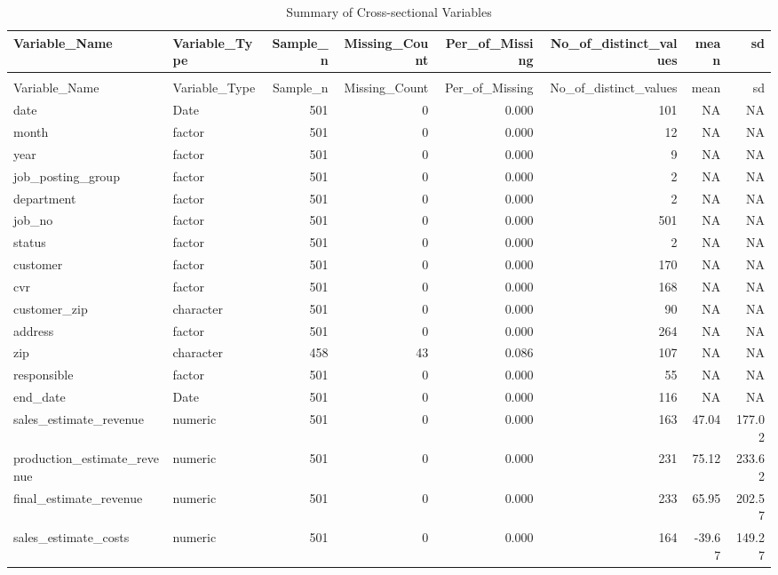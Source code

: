 \begingroup\fontsize{9}{11}\selectfont

\begin{landscape}
\begin{longtable}[t]{llrrrrrr}
\caption{Summary of Cross-sectional Variables}\\
\toprule
Variable\_Name & Variable\_Type & Sample\_n & Missing\_Count & Per\_of\_Missing & No\_of\_distinct\_values & mean & sd\\
\midrule
\endfirsthead
\caption[]{Summary of Cross-sectional Variables }\\
\toprule
Variable\_Name & Variable\_Type & Sample\_n & Missing\_Count & Per\_of\_Missing & No\_of\_distinct\_values & mean & sd\\
\midrule
\endhead

\endfoot
\bottomrule
\endlastfoot
date & Date & 501 & 0 & 0.000 & 101 & NA & NA\\
month & factor & 501 & 0 & 0.000 & 12 & NA & NA\\
year & factor & 501 & 0 & 0.000 & 9 & NA & NA\\
job\_posting\_group & factor & 501 & 0 & 0.000 & 2 & NA & NA\\
department & factor & 501 & 0 & 0.000 & 2 & NA & NA\\
job\_no & factor & 501 & 0 & 0.000 & 501 & NA & NA\\
status & factor & 501 & 0 & 0.000 & 2 & NA & NA\\
customer & factor & 501 & 0 & 0.000 & 170 & NA & NA\\
cvr & factor & 501 & 0 & 0.000 & 168 & NA & NA\\
customer\_zip & character & 501 & 0 & 0.000 & 90 & NA & NA\\
address & factor & 501 & 0 & 0.000 & 264 & NA & NA\\
zip & character & 458 & 43 & 0.086 & 107 & NA & NA\\
responsible & factor & 501 & 0 & 0.000 & 55 & NA & NA\\
end\_date & Date & 501 & 0 & 0.000 & 116 & NA & NA\\
sales\_estimate\_revenue & numeric & 501 & 0 & 0.000 & 163 & 47.04 & 177.02\\
production\_estimate\_revenue & numeric & 501 & 0 & 0.000 & 231 & 75.12 & 233.62\\
final\_estimate\_revenue & numeric & 501 & 0 & 0.000 & 233 & 65.95 & 202.57\\
sales\_estimate\_costs & numeric & 501 & 0 & 0.000 & 164 & -39.67 & 149.27\\

\end{longtable}
\end{landscape}
